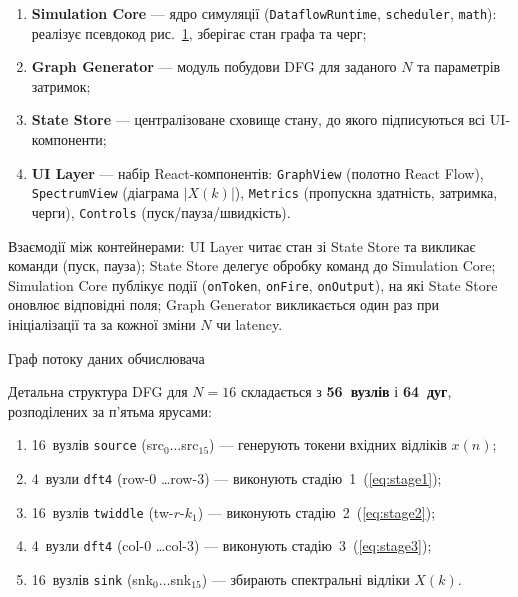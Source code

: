 \begin{enumerate}
\def\labelenumi{\arabic{enumi}.}
\item
  \textbf{Simulation Core} --- ядро симуляції (\texttt{DataflowRuntime},
  \texttt{scheduler}, \texttt{math}): реалізує псевдокод
  рис.~\hyperref[fig:tick_pseudo]{1}, зберігає стан графа та черг;
\item
  \textbf{Graph Generator} --- модуль побудови DFG для заданого \(N\) та
  параметрів затримок;
\item
  \textbf{State Store} --- централізоване сховище стану, до якого
  підписуються всі UI-компоненти;
\item
  \textbf{UI Layer} --- набір React-компонентів: \texttt{GraphView}
  (полотно React Flow), \texttt{SpectrumView} (діаграма \(|X(k)|\)),
  \texttt{Metrics} (пропускна здатність, затримка, черги),
  \texttt{Controls} (пуск/пауза/швидкість).
\end{enumerate}

Взаємодії між контейнерами: UI Layer читає стан зі State Store та
викликає команди (пуск, пауза); State Store делегує обробку команд до
Simulation Core; Simulation Core публікує події (\texttt{onToken},
\texttt{onFire}, \texttt{onOutput}), на які State Store оновлює
відповідні поля; Graph Generator викликається один раз при ініціалізації
та за кожної зміни \(N\) чи latency.

Граф потоку даних обчислювача

Детальна структура DFG для \(N = 16\) складається з \textbf{56~вузлів} і
\textbf{64~дуг}, розподілених за п'ятьма ярусами:

\begin{enumerate}
\def\labelenumi{\arabic{enumi}.}
\item
  16~вузлів \texttt{source} (src\(_{0}\ldots\)src\(_{15}\)) ---
  генерують токени вхідних відліків \(x(n)\);
\item
  4~вузли \texttt{dft4} (row-0 \ldots row-3) --- виконують
  стадію~1~(\hyperref[eq:stage1]{{[}eq:stage1{]}});
\item
  16~вузлів \texttt{twiddle} (tw-\(r\)-\(k_{1}\)) --- виконують
  стадію~2~(\hyperref[eq:stage2]{{[}eq:stage2{]}});
\item
  4~вузли \texttt{dft4} (col-0 \ldots col-3) --- виконують
  стадію~3~(\hyperref[eq:stage3]{{[}eq:stage3{]}});
\item
  16~вузлів \texttt{sink} (snk\(_{0}\ldots\)snk\(_{15}\)) --- збирають
  спектральні відліки \(X(k)\).
\end{enumerate}

